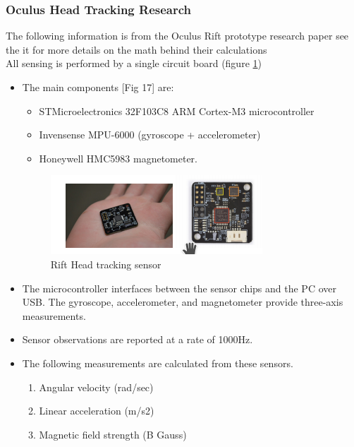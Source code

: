 \documentclass[a4paper,10pt]{article}
\begin{document}
\subsubsection{Oculus Head Tracking Research}
The following information is from the Oculus Rift prototype research paper see the it for more details on the math behind their calculations \cite{riftPaper}~\\
All sensing is performed by a single circuit board (figure \ref{fig:magnetsHowDoTheyWork}) 
\begin{itemize}
\item The main components [Fig 17] are:
\begin{itemize}
 \item STMicroelectronics 32F103C8 ARM Cortex-M3 microcontroller
 \item Invensense MPU-6000 (gyroscope + accelerometer)
 \item Honeywell HMC5983 magnetometer.
\end{itemize}
\begin{figure}[H]
	\centerline{\includegraphics[]{riftMagnets.png}}
	\caption{Rift Head tracking sensor}
	\label{fig:magnetsHowDoTheyWork}
	\end{figure}
	

\item The microcontroller interfaces between the sensor chips
and the PC over USB. The gyroscope, accelerometer, and magnetometer provide three-axis measurements.

\item Sensor observations are reported at a rate of 1000Hz.
\item The following measurements are calculated from these sensors.
  \begin{enumerate}
  \item Angular velocity (rad/sec)
  \item Linear acceleration (m/s2)
  \item Magnetic field strength (B Gauss)
  \end{enumerate}
\end{itemize}
\end{document}
